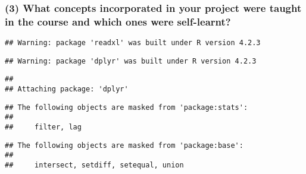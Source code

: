 \documentclass[
]{article}
\begin{document}
\hypertarget{what-concepts-incorporated-in-your-project-were-taught-in-the-course-and-which-ones-were-self-learnt}{%
\subsubsection{(3) What concepts incorporated in your project were
taught in the course and which ones were
self-learnt?}\label{what-concepts-incorporated-in-your-project-were-taught-in-the-course-and-which-ones-were-self-learnt}}

\begin{verbatim}
## Warning: package 'readxl' was built under R version 4.2.3
\end{verbatim}

\begin{verbatim}
## Warning: package 'dplyr' was built under R version 4.2.3
\end{verbatim}

\begin{verbatim}
## 
## Attaching package: 'dplyr'
\end{verbatim}

\begin{verbatim}
## The following objects are masked from 'package:stats':
## 
##     filter, lag
\end{verbatim}

\begin{verbatim}
## The following objects are masked from 'package:base':
## 
##     intersect, setdiff, setequal, union
\end{verbatim}
\end{document}
